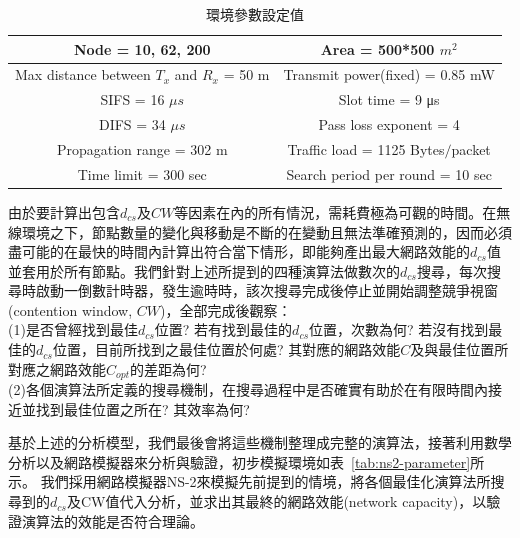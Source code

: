 \documentclass[12pt,a4paper]{article}
\newcommand{\Tab}[1]{表~\ref{#1}}
\begin{document}
\begin{description}
\begin{enumerate}
\begin{table}[!htb]
\centering
\caption{環境參數設定值}
\vspace{0.2cm}
\small
\begin{tabular}{|c|c|}
\hline
Node = 10, 62, 200 & Area = 500*500 $m^2$ \\
\hline
Max distance between $T_x$ and $R_x$ = 50 m & Transmit power(fixed) = 0.85 mW \\
\hline
SIFS = 16 $\mu s$ & Slot time = 9 μs \\
\hline
DIFS = 34 $\mu s$ & Pass loss exponent = 4 \\
\hline
Propagation range = 302 m & Traffic load = 1125 Bytes$/$packet\\
\hline
Time limit = 300 sec & Search period per round = 10 sec\\
\hline
\end{tabular}
\label{tab:env-parameter}
\end{table}

由於要計算出包含$d_{cs}$及$CW$等因素在內的所有情況，需耗費極為可觀的時間。在無線環境之下，節點數量的變化與移動是不斷的在變動且無法準確預測的，因而必須盡可能的在最快的時間內計算出符合當下情形，即能夠產出最大網路效能的$d_{cs}$值並套用於所有節點。我們針對上述所提到的四種演算法做數次的$d_{cs}$搜尋，每次搜尋時啟動一倒數計時器，發生逾時時，該次搜尋完成後停止並開始調整競爭視窗(contention window, $CW$)，全部完成後觀察：\\
(1)是否曾經找到最佳$d_{cs}$位置? 若有找到最佳的$d_{cs}$位置，次數為何? 若沒有找到最佳的$d_{cs}$位置，目前所找到之最佳位置於何處? 其對應的網路效能$C$及與最佳位置所對應之網路效能$C_{opt}$的差距為何? \\
(2)各個演算法所定義的搜尋機制，在搜尋過程中是否確實有助於在有限時間內接近並找到最佳位置之所在? 其效率為何?

基於上述的分析模型，我們最後會將這些機制整理成完整的演算法，接著利用數學分析以及網路模擬器來分析與驗證，初步模擬環境如\Tab{tab:ns2-parameter}所示。
我們採用網路模擬器NS-2來模擬先前提到的情境，將各個最佳化演算法所搜尋到的$d_{cs}$及CW值代入分析，並求出其最終的網路效能(network capacity)，以驗證演算法的效能是否符合理論。\\




\end{enumerate}
\end{description}
\end{document}
